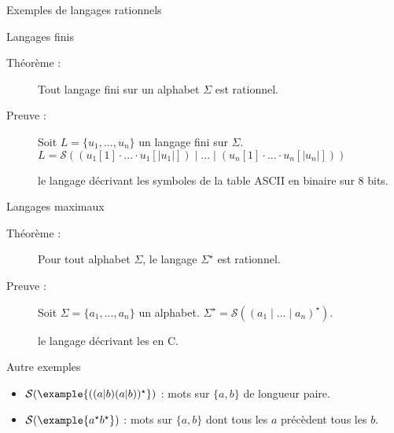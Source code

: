 
\begingroup


\begin{frame}{Exemples de langages rationnels}
  \begin{block}{Langages finis}
    \vspace{-2mm}
    \begin{description}
    \item[Théorème :]
      Tout \alert{langage fini} sur un alphabet $\Sigma$ est rationnel.
    \item[Preuve :]
      Soit $L = \{u_1, ..., u_n\}$ un langage fini sur $\Sigma$.
      $L = \mathcal{S} \left( (u_1[1] \cdot ... \cdot u_1[|u_1|])  \mid ... \mid   (u_n[1] \cdot ... \cdot u_n[|u_n|]) \right) $
    \item[] le langage  décrivant les symboles de la table ASCII en binaire sur 8 bits.
    \end{description}
  \end{block}

  \begin{block}{Langages maximaux}
    \vspace{-2mm}
    \begin{description}
    \item[Théorème :]
      Pour tout alphabet $\Sigma$, le langage \alert{$\Sigma^\star$} est rationnel.
    \item[Preuve :]
      Soit $\Sigma = \{a_1, ..., a_n\}$ un alphabet.
      $\Sigma^\star = \mathcal{S}((a_1 \mid ... \mid a_n)^\star)$.
    \item[] le langage décrivant les  en C.
    \end{description}
  \end{block}

    \begin{block}{Autre exemples}
      \begin{itemize}
      \item $\mathcal{S}(\example{((a|b)(a|b))^\star})$ : mots sur $\{a, b\}$ de longueur paire.
      \item $\mathcal{S}(\example{a^\star b^\star})$ : mots sur $\{a, b\}$ dont tous les $a$ précèdent tous les $b$.
      \end{itemize}
  \end{block}
  
\end{frame}

\endgroup
